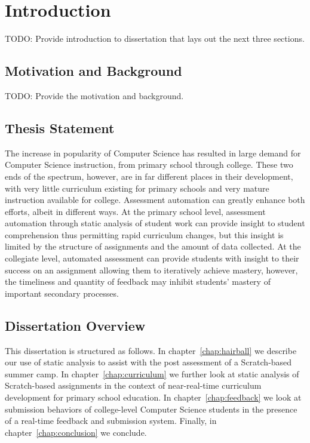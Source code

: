 \chapter{Introduction}
TODO: Provide introduction to dissertation that lays out the next three
sections.

\section{Motivation and Background}
TODO: Provide the motivation and background.

\section{Thesis Statement}
The increase in popularity of Computer Science has resulted in large demand for
Computer Science instruction, from primary school through college. These two
ends of the spectrum, however, are in far different places in their
development, with very little curriculum existing for primary schools and very
mature instruction available for college. Assessment automation can greatly
enhance both efforts, albeit in different ways. At the primary school level,
assessment automation through static analysis of student work can provide
insight to student comprehension thus permitting rapid curriculum changes, but
this insight is limited by the structure of assignments and the amount of data
collected. At the collegiate level, automated assessment can provide students
with insight to their success on an assignment allowing them to iteratively
achieve mastery, however, the timeliness and quantity of feedback may inhibit
students' mastery of important secondary processes.

\section{Dissertation Overview}
This dissertation is structured as follows. In chapter~\ref{chap:hairball} we
describe our use of static analysis to assist with the post assessment of a
Scratch-based summer camp. In chapter~\ref{chap:curriculum} we further look at
static analysis of Scratch-based assignments in the context of near-real-time
curriculum development for primary school education. In
chapter~\ref{chap:feedback} we look at submission behaviors of college-level
Computer Science students in the presence of a real-time feedback and
submission system. Finally, in chapter~\ref{chap:conclusion} we conclude.
